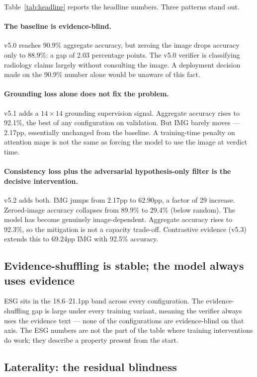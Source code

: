 \documentclass[pmlr]{jmlr}
\begin{document}
Table~\ref{tab:headline} reports the headline numbers. Three patterns stand out.

\paragraph{The baseline is evidence-blind.} v5.0 reaches 90.9\% aggregate accuracy, but zeroing the image drops accuracy only to 88.9\%: a gap of 2.03 percentage points. The v5.0 verifier is classifying radiology claims largely without consulting the image. A deployment decision made on the 90.9\% number alone would be unaware of this fact.

\paragraph{Grounding loss alone does not fix the problem.} v5.1 adds a $14 \times 14$ grounding supervision signal. Aggregate accuracy rises to 92.1\%, the best of any configuration on validation. But IMG barely moves — 2.17pp, essentially unchanged from the baseline. A training-time penalty on attention maps is not the same as forcing the model to use the image at verdict time.

\paragraph{Consistency loss plus the adversarial hypothesis-only filter is the decisive intervention.} v5.2 adds both. IMG jumps from 2.17pp to 62.90pp, a factor of 29 increase. Zeroed-image accuracy collapses from 89.9\% to 29.4\% (below random). The model has become genuinely image-dependent. Aggregate accuracy rises to 92.3\%, so the mitigation is not a capacity trade-off. Contrastive evidence (v5.3) extends this to 69.24pp IMG with 92.5\% accuracy.

\subsection{Evidence-shuffling is stable; the model always uses evidence}

ESG sits in the 18.6--21.1pp band across every configuration. The evidence-shuffling gap is large under every training variant, meaning the verifier always uses the evidence text — none of the configurations are evidence-blind on that axis. The ESG numbers are not the part of the table where training interventions do work; they describe a property present from the start.

\subsection{Laterality: the residual blindness}
\end{document}
